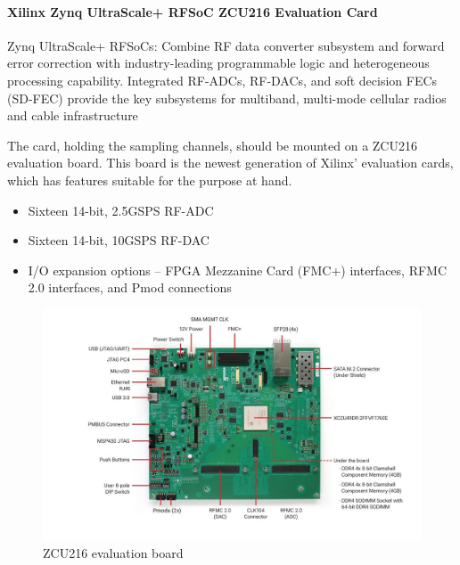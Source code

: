 \paragraph{Xilinx Zynq UltraScale+ RFSoC ZCU216 Evaluation Card}

Zynq UltraScale+ RFSoCs: Combine RF data converter subsystem and forward error correction with industry-leading
programmable logic and heterogeneous processing capability. Integrated RF-ADCs, RF-DACs, and soft decision FECs (SD-FEC)
provide the key subsystems for multiband, multi-mode cellular radios and cable infrastructure


The card, holding the sampling channels, should be mounted on a ZCU216 evaluation board. This board is the newest generation of Xilinx' evaluation cards, which has features suitable for the purpose at hand.
\begin{itemize}[noitemsep]
\item Sixteen 14-bit, 2.5GSPS RF-ADC
\item Sixteen 14-bit, 10GSPS RF-DAC
\item I/O expansion options – FPGA Mezzanine Card (FMC+) interfaces, RFMC 2.0 interfaces, and Pmod connections
\end{itemize}
\begin{figure}[H]
	\centering
	\includegraphics[width = \textwidth]{chap/03-work/img/zcu216}
	\caption{ZCU216 evaluation board}
	\label{fig:zcu216}
\end{figure}
 
